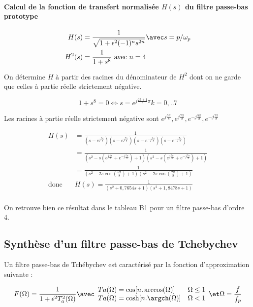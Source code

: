 \documentclass[../../Cours_M1.tex]{subfiles}
\begin{document}
\paragraph{Calcul de la fonction de transfert normalisée $H(s)$ du filtre passe-bas prototype}

\begin{align*}
H(s) & = \frac{1}{\sqrt{1+\epsilon^2(-1)^ns^{2n}}} \avec s = p/\omega_p\\
H^2(s) & = \frac{1}{1+s^8} \text{ avec } n=4
\end{align*}

On détermine $H$ à partir des racines du dénominateur de $H^2$ dont on ne garde que celles à partie réelle strictement négative.

\[1+s^8 = 0 \Leftrightarrow s = e^{j\frac{2k+1}{8}\pi} k=0,..7 \]

Les racines à partie réelle strictement négative sont $e^{j\frac{5\pi}{8}},e^{j\frac{7\pi}{8}},e^{-j\frac{5\pi}{8}},e^{-j\frac{7\pi}{8}}$

\begin{align*}
H(s) & = \frac{1}{(s-e^{j\frac{5\pi}{8}})(s-e^{j\frac{7\pi}{8}})(s-e^{-j\frac{5\pi}{8}})(s-e^{-j\frac{7\pi}{8}})} \\
& = \frac{1}{(s^2-s(e^{j\frac{5\pi}{8}}+e^{-j\frac{5\pi}{8}})+1)(s^2-s(e^{j\frac{7\pi}{8}}+e^{-j\frac{7\pi}{8}})+1)} \\
& = \frac{1}{(s^2-2s\cos(\frac{5\pi}{8})+1)(s^2-2s\cos(\frac{7\pi}{8})+1)} \\
\text{donc } & \boxed{H(s) = \frac{1}{(s^2+0,7654s+1)(s^2+1,8478s+1)}} \\
\end{align*}

On retrouve bien ce résultat dans le tableau B1 pour un filtre passe-bas d'ordre 4.


\subsection{Synthèse d'un filtre passe-bas de Tchebychev}

Un filtre passe-bas de Tchébychev est caractérisé par la fonction d'approximation suivante :

\[ F(\Omega) = \frac{1}{1+\epsilon^2T_a^2(\Omega)} \avec \begin{array}{ll}
Ta(\Omega) = \cos[n.\arccos(\Omega)] & \Omega \leq 1 \\
Ta(\Omega) = \cosh[n.\argch(\Omega)] & \Omega < 1
\end{array}
\et \Omega = \frac{f}{f_p}
\]
\end{document}
